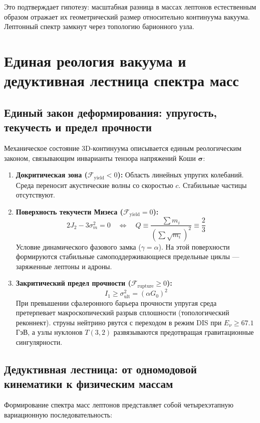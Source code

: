 \documentclass[12pt,a4paper]{article}
\begin{document}
Это подтверждает гипотезу: масштабная разница в массах лептонов естественным образом отражает их геометрический размер относительно континуума вакуума.
Лептонный спектр замкнут через топологию барионного узла.

\section{Единая реология вакуума и дедуктивная лестница спектра масс}

\subsection{Единый закон деформирования: упругость, текучесть и предел прочности}
Механическое состояние 3D-континуума описывается единым реологическим законом, связывающим инварианты тензора напряжений Коши $\boldsymbol{\sigma}$:
\begin{enumerate}
	\item \textbf{Докритическая зона ($\mathcal{F}_{\mathrm{yield}} < 0$):} Область линейных упругих колебаний. Среда переносит акустические волны со скоростью $c$. Стабильные частицы отсутствуют.
	\item \textbf{Поверхность текучести Мизеса ($\mathcal{F}_{\mathrm{yield}} = 0$):} 
	\begin{equation}
		2 J_2 - 3 \sigma_m^2 = 0 \quad \Longleftrightarrow \quad Q \equiv \frac{\sum m_i}{\left(\sum \sqrt{m_i}\right)^2} \equiv \frac{2}{3}
	\end{equation}
	Условие динамического фазового замка ($\gamma = \alpha$). На этой поверхности формируются стабильные самоподдерживающиеся предельные циклы — заряженные лептоны и адроны.
	\item \textbf{Закритический предел прочности ($\mathcal{F}_{\mathrm{rupture}} \ge 0$):}
	\begin{equation}
		I_1 \ge \sigma_{\mathrm{ult}}^2 = (\alpha G_0)^2
	\end{equation}
	При превышении сфалеронного барьера прочности упругая среда претерпевает макроскопический разрыв сплошности (топологический реконнект). струны нейтрино рвутся с переходом в режим DIS при $E_\nu \ge 67.1$ ГэВ, а узлы нуклонов $T(3,2)$ развязываются предотвращая гравитационные сингулярности.
\end{enumerate}

\subsection{Дедуктивная лестница: от одномодовой кинематики к физическим массам}
Формирование спектра масс лептонов представляет собой четырехэтапную вариационную последовательность:
\end{document}
